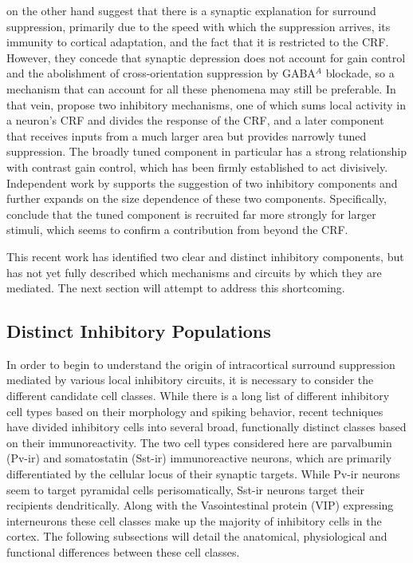\cite{Carandini2002} on the other hand suggest that there is a
synaptic explanation for surround suppression, primarily due to the
speed with which the suppression arrives, its immunity to cortical
adaptation, and the fact that it is restricted to the CRF. However,
they concede that synaptic depression does not account for gain
control and the abolishment of cross-orientation suppression by
GABA$^{A}$ blockade, so a mechanism that can account for all these
phenomena may still be preferable. In that vein, \cite{Webb2005}
propose two inhibitory mechanisms, one of which sums local activity in
a neuron's CRF and divides the response of the CRF, and a later
component that receives inputs from a much larger area but provides
narrowly tuned suppression. The broadly tuned component in particular
has a strong relationship with contrast gain control, which has been
firmly established to act divisively. Independent work by
\cite{Xing2005} supports the suggestion of two inhibitory components
and further expands on the size dependence of these two
components. Specifically, \cite{Xing2005} conclude that the tuned component is
recruited far more strongly for larger stimuli, which seems to confirm
a contribution from beyond the CRF.

This recent work has identified two clear and distinct inhibitory
components, but has not yet fully described which mechanisms and
circuits by which they are mediated.  The next section will attempt to
address this shortcoming.

\subsection{Distinct Inhibitory Populations} \label{InhibitoryBackground}

In order to begin to understand the origin of intracortical surround
suppression mediated by various local inhibitory circuits, it is
necessary to consider the different candidate cell classes. While
there is a long list of different inhibitory cell types based on their
morphology and spiking behavior, recent techniques have divided
inhibitory cells into several broad, functionally distinct classes
based on their immunoreactivity. The two cell types considered here
are parvalbumin (Pv-ir) and somatostatin (Sst-ir) immunoreactive
neurons, which are primarily differentiated by the cellular locus of
their synaptic targets. While Pv-ir neurons seem to target pyramidal
cells perisomatically, Sst-ir neurons target their recipients
dendritically. Along with the Vasointestinal protein (VIP) expressing
interneurons these cell classes make up the majority of inhibitory
cells in the cortex. The following subsections will detail the
anatomical, physiological and functional differences between these
cell classes.

